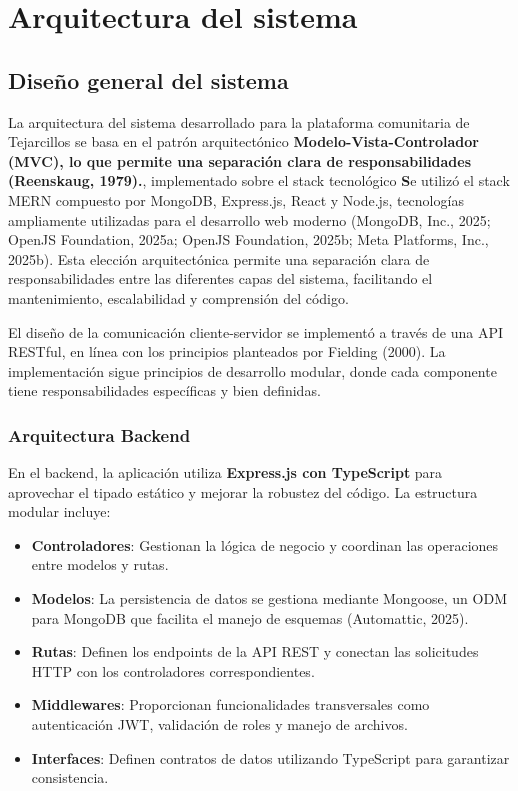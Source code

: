\chapter{Arquitectura del sistema}

\section{Diseño general del sistema}

La arquitectura del sistema desarrollado para la plataforma comunitaria de Tejarcillos se basa en el patrón arquitectónico \textbf{Modelo-Vista-Controlador (MVC), lo que permite una separación clara de responsabilidades (Reenskaug, 1979).}, implementado sobre el stack tecnológico \textbf Se utilizó el stack MERN compuesto por MongoDB, Express.js, React y Node.js, tecnologías ampliamente utilizadas para el desarrollo web moderno (MongoDB, Inc., 2025; OpenJS Foundation, 2025a; OpenJS Foundation, 2025b; Meta Platforms, Inc., 2025b). Esta elección arquitectónica permite una separación clara de responsabilidades entre las diferentes capas del sistema, facilitando el mantenimiento, escalabilidad y comprensión del código.

El diseño de la comunicación cliente-servidor se implementó a través de una API RESTful, en línea con los principios planteados por Fielding (2000). La implementación sigue principios de desarrollo modular, donde cada componente tiene responsabilidades específicas y bien definidas.

\subsection*{Arquitectura Backend}
En el backend, la aplicación utiliza \textbf{Express.js con TypeScript} para aprovechar el tipado estático y mejorar la robustez del código. La estructura modular incluye:
\begin{itemize}
  \item \textbf{Controladores}: Gestionan la lógica de negocio y coordinan las operaciones entre modelos y rutas.
  \item \textbf{Modelos}: La persistencia de datos se gestiona mediante {Mongoose}, un ODM para MongoDB que facilita el manejo de esquemas (Automattic, 2025).
  \item \textbf{Rutas}: Definen los endpoints de la API REST y conectan las solicitudes HTTP con los controladores correspondientes.
  \item \textbf{Middlewares}: Proporcionan funcionalidades transversales como autenticación JWT, validación de roles y manejo de archivos.
  \item \textbf{Interfaces}: Definen contratos de datos utilizando TypeScript para garantizar consistencia.
\end{itemize}

